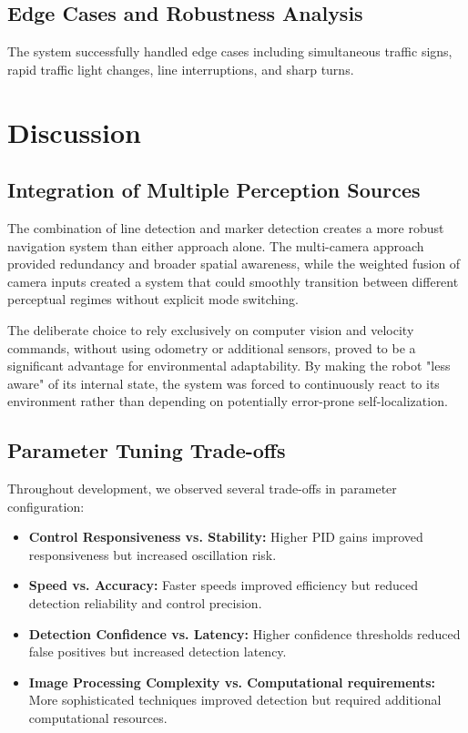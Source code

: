 \documentclass[9pt,technote]{IEEEtran}
\begin{document}
\subsection{Edge Cases and Robustness Analysis}
The system successfully handled edge cases including simultaneous traffic signs, rapid traffic light changes, line interruptions, and sharp turns.

\section{Discussion}

\subsection{Integration of Multiple Perception Sources}
The combination of line detection and marker detection creates a more robust navigation system than either approach alone. The multi-camera approach provided redundancy and broader spatial awareness, while the weighted fusion of camera inputs created a system that could smoothly transition between different perceptual regimes without explicit mode switching.

The deliberate choice to rely exclusively on computer vision and velocity commands, without using odometry or additional sensors, proved to be a significant advantage for environmental adaptability. By making the robot "less aware" of its internal state, the system was forced to continuously react to its environment rather than depending on potentially error-prone self-localization.

\subsection{Parameter Tuning Trade-offs}
Throughout development, we observed several trade-offs in parameter configuration:

\begin{itemize}
    \item \textbf{Control Responsiveness vs. Stability:} Higher PID gains improved responsiveness but increased oscillation risk.
    \item \textbf{Speed vs. Accuracy:} Faster speeds improved efficiency but reduced detection reliability and control precision.
    \item \textbf{Detection Confidence vs. Latency:} Higher confidence thresholds reduced false positives but increased detection latency.
    \item \textbf{Image Processing Complexity vs. Computational requirements:} More sophisticated techniques improved detection but required additional computational resources.
\end{itemize}
\end{document}
